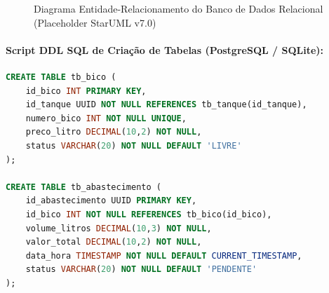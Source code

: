 \begin{figure}[htbp]
    \centering
    \caption{Diagrama Entidade-Relacionamento do Banco de Dados Relacional (Placeholder StarUML v7.0)}
    \label{fig:er_banco_posto}
\end{figure}

\paragraph{Script DDL SQL de Criação de Tabelas (PostgreSQL / SQLite):}
\begin{lstlisting}[language=SQL]
CREATE TABLE tb_bico (
    id_bico INT PRIMARY KEY,
    id_tanque UUID NOT NULL REFERENCES tb_tanque(id_tanque),
    numero_bico INT NOT NULL UNIQUE,
    preco_litro DECIMAL(10,2) NOT NULL,
    status VARCHAR(20) NOT NULL DEFAULT 'LIVRE'
);

CREATE TABLE tb_abastecimento (
    id_abastecimento UUID PRIMARY KEY,
    id_bico INT NOT NULL REFERENCES tb_bico(id_bico),
    volume_litros DECIMAL(10,3) NOT NULL,
    valor_total DECIMAL(10,2) NOT NULL,
    data_hora TIMESTAMP NOT NULL DEFAULT CURRENT_TIMESTAMP,
    status VARCHAR(20) NOT NULL DEFAULT 'PENDENTE'
);
\end{lstlisting}
